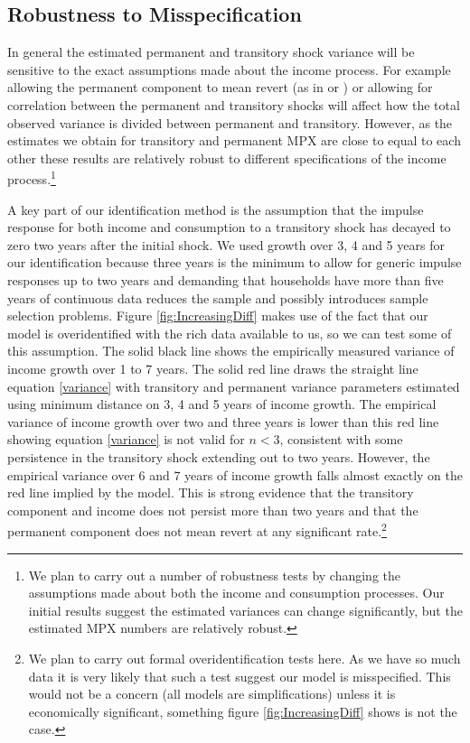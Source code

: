 \documentclass[titlepage]{\econtex}\newcommand{\texname}{IncomeUncertainty}
\begin{document}
\subsection{Robustness to Misspecification} \label{misspecification}
In general the estimated permanent and transitory shock variance will be sensitive to the exact assumptions made about the income process. For example allowing the permanent component to mean revert (as in \cite{ahn_when_2017} or \cite{arellano_earnings_2017}) or allowing for correlation between the permanent and transitory shocks will affect how the total observed variance is divided between permanent and transitory. However, as the estimates we obtain for transitory and permanent MPX are close to equal to each other these results are relatively robust to different specifications of the income process.\footnote{We plan to carry out a number of robustness tests by changing the assumptions made about both the income and consumption processes. Our initial results suggest the estimated variances can change significantly, but the estimated MPX numbers are relatively robust.}

A key part of our identification method is the assumption that the impulse response for both income and consumption to a transitory shock has decayed to zero two years after the initial shock. We used growth over 3, 4 and 5 years for our identification because three years is the minimum to allow for generic impulse responses up to two years and demanding that households have more than five years of continuous data reduces the sample and possibly introduces sample selection problems. Figure \ref{fig:IncreasingDiff} makes use of the fact that our model is overidentified with the rich data available to us, so we can test some of this assumption. The solid black line shows the empirically measured variance of income growth over 1 to 7 years. The solid red line draws the straight line equation \ref{variance} with transitory and permanent variance parameters estimated using minimum distance on 3, 4 and 5 years of income growth. The empirical variance of income growth over two and three years is lower than this red line showing equation \ref{variance} is not valid for $n < 3$, consistent with some persistence in the transitory shock extending out to two years. However, the empirical variance over 6 and 7 years of income growth falls almost exactly on the red line implied by the model. This is strong evidence that the transitory component and income does not persist more than two years and that the permanent component does not mean revert at any significant rate.\footnote{We plan to carry out formal overidentification tests here. As we have so much data it is very likely that such a test suggest our model is misspecified. This would not be a concern (all models are simplifications) unless it is economically significant, something figure \ref{fig:IncreasingDiff} shows is not the case.}
\end{document}
